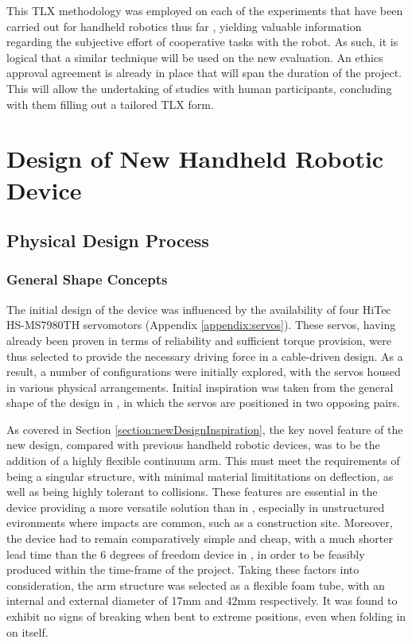 \documentclass[11pt]{article}
\begin{document}
This TLX methodology was employed on each of the experiments that have been carried out for handheld robotics thus far \cite{GreggSmithDesign} \cite{GreggSmithFeedback}, yielding valuable information regarding the subjective effort of cooperative tasks with the robot. As such, it is logical that a similar technique will be used on the new evaluation. An ethics approval agreement is already in place that will span the duration of the project. This will allow the undertaking of studies with human participants, concluding with them filling out a tailored TLX form. 
\pagebreak


\section{Design of New Handheld Robotic Device}

\subsection{Physical Design Process}
\subsubsection{General Shape Concepts}
The initial design of the device was influenced by the availability of four HiTec HS-MS7980TH servomotors (Appendix \ref{appendix:servos}). These servos, having already been proven in terms of reliability and sufficient torque provision, were thus selected to provide the necessary driving force in a cable-driven design. As a result, a number of configurations were initially explored, with the servos housed in various physical arrangements. Initial inspiration was taken from the general shape of the design in \cite{GreggSmithDesign}, in which the servos are positioned in two opposing pairs.

As covered in Section \ref{section:newDesignInspiration}, the key novel feature of the new design, compared with previous handheld robotic devices, was to be the addition of a highly flexible continuum arm. This must meet the requirements of being a singular structure, with minimal material limititations on deflection, as well as being highly tolerant to collisions. These features are essential in the device providing a more versatile solution than in \cite{GreggSmithDesign}, especially in unstructured evironments where impacts are common, such as a construction site. Moreover, the device had to remain comparatively simple and cheap, with a much shorter lead time than the 6 degrees of freedom device in \cite{GreggSmithKinematics}, in order to be feasibly produced within the time-frame of the project. Taking these factors into consideration, the arm structure was selected as a flexible foam tube, with an internal and external diameter of 17mm and 42mm respectively. It was found to exhibit no signs of breaking when bent to extreme positions, even when folding in on itself.
\end{document}
